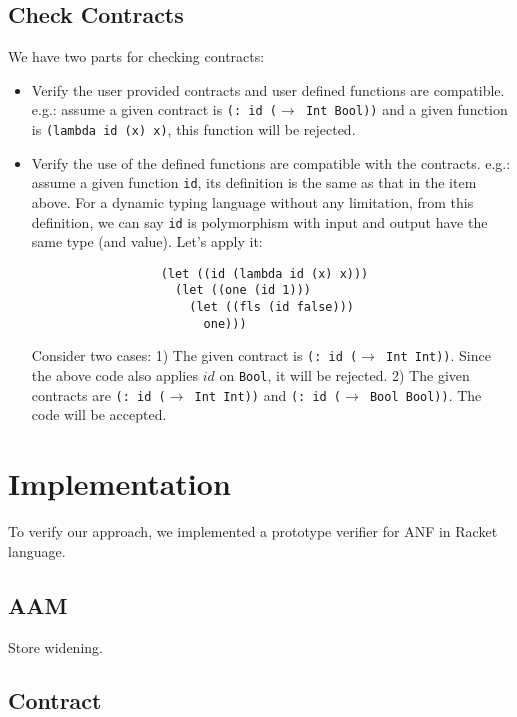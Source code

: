 \documentclass[paper=a4, fontsize=11pt]{scrartcl} %
\numberwithin{equation}{section} %
\numberwithin{figure}{section} %
\numberwithin{table}{section} %
\begin{document}
\subsection{Check Contracts}
We have two parts for checking contracts:
\begin{itemize}
\item Verify the user provided contracts and user defined functions are compatible. e.g.: assume a given contract is \texttt{(: id ($\rightarrow$ Int Bool))} and a given function is \texttt{(lambda\ id\ (x)\ x)}, this function will be rejected.

\item Verify the use of the defined functions are compatible with the contracts. e.g.: assume a given function \texttt{id}, its definition is the same as that in the item above. For a dynamic typing language without any limitation, from this definition, we can say \texttt{id} is polymorphism with input and output have the same type (and value). Let's apply it:
\begin{verbatim}
                  (let ((id (lambda id (x) x)))
                    (let ((one (id 1)))
                      (let ((fls (id false)))
                        one)))
\end{verbatim}
Consider two cases: 1) The given contract is \texttt{(: id ($\rightarrow$ Int Int))}. Since the above code also applies $id$ on \texttt{Bool}, it will be rejected. 2) The given contracts are \texttt{(: id ($\rightarrow$ Int Int))} and \texttt{(: id ($\rightarrow$ Bool Bool))}. The code will be accepted. 
\end{itemize}



\section{Implementation}

To verify our approach, we implemented a prototype verifier for ANF in Racket language.

\subsection{AAM}
Store widening.

\subsection{Contract}
\end{document}
